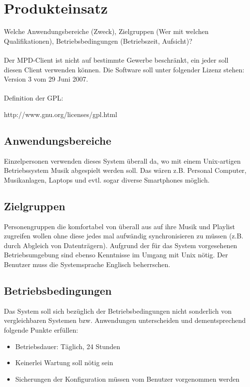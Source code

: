 \section{Produkteinsatz}
Welche Anwendungsbereiche (Zweck), Zielgruppen (Wer mit welchen Qualifikationen), Betriebsbedingungen (Betriebszeit,
Aufsicht)?\ \\ \\
Der MPD-Client ist nicht auf bestimmte Gewerbe beschränkt, ein jeder soll diesen Client
verwenden können. 
Die Software soll unter folgender Lizenz stehen:
Version 3 vom 29 Juni 2007.\ \\ \\
Definition der GPL:
\begin{center}
http://www.gnu.org/licenses/gpl.html
\end{center}
\subsection{Anwendungsbereiche}
Einzelpersonen verwenden dieses System überall da, wo mit
einem Unix-artigen Betriebssystem Musik abgespielt werden soll.
Das wären z.B. Personal Computer, Musikanlagen, Laptops und evtl.
sogar diverse Smartphones möglich.

\subsection{Zielgruppen}
Personengruppen die komfortabel von überall aus auf ihre Musik und Playlist zugreifen
wollen ohne diese jedes mal aufwändig synchronisieren zu müssen (z.B. durch Abgleich von Datenträgern). 
Aufgrund der für das System vorgesehenen Betriebsumgebung sind ebenso Kenntnisse im Umgang mit Unix nötig. 
Der Benutzer muss die Systemsprache Englisch beherrschen.


\subsection{Betriebsbedingungen}
Das System soll sich bezüglich der Betriebsbedingungen nicht sonderlich von vergleichbaren Systemen bzw.
Anwendungen unterscheiden und dementsprechend folgende Punkte erfüllen:
\begin{itemize}
        \item Betriebsdauer: Täglich, 24 Stunden
        \item Keinerlei Wartung soll nötig sein
        \item Sicherungen der Konfiguration müssen vom Benutzer vorgenommen werden
\end{itemize}

